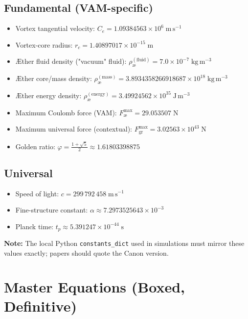 \documentclass[11pt]{article}
\begin{document}
\subsection{Fundamental (VAM-specific)}
\begin{itemize}
    \item Vortex tangential velocity: $C_e = 1.09384563 \times 10^{6}\;\mathrm{m}\,\mathrm{s}^{-1}$
    \item Vortex-core radius: $r_c = 1.40897017 \times 10^{-15}\;\mathrm{m}$
    \item Æther fluid density ("vacuum" fluid): $\rho_{\text{\ae}}^{(\text{fluid})} = 7.0 \times 10^{-7}\;\mathrm{kg}\,\mathrm{m}^{-3}$
    \item Æther core/mass density: $\rho_{\text{\ae}}^{(\text{mass})} = 3.8934358266918687 \times 10^{18}\;\mathrm{kg}\,\mathrm{m}^{-3}$
    \item Æther energy density: $\rho_{\text{\ae}}^{(\text{energy})} = 3.49924562 \times 10^{35}\;\mathrm{J}\,\mathrm{m}^{-3}$
    \item Maximum Coulomb force (VAM): $F_{\text{\ae}}^{\max} = 29.053507\;\mathrm{N}$
    \item Maximum universal force (contextual): $F_{\text{gr}}^{\max} = 3.02563 \times 10^{43}\;\mathrm{N}$
    \item Golden ratio: $\varphi = \frac{1+\sqrt{5}}{2} \approx 1.61803398875$
\end{itemize}

\subsection{Universal}
\begin{itemize}
    \item Speed of light: $c = 299\,792\,458\;\mathrm{m}\,\mathrm{s}^{-1}$
    \item Fine-structure constant: $\alpha \approx 7.2973525643 \times 10^{-3}$
    \item Planck time: $t_p \approx 5.391247 \times 10^{-44}\;\mathrm{s}$
\end{itemize}

\textbf{Note:} The local Python \texttt{constants\_dict} used in simulations must mirror these values exactly; papers should quote the Canon version.




\section{Master Equations (Boxed, Definitive)}
\end{document}
